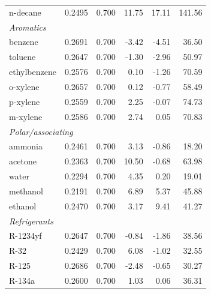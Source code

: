\begin{table}[H]
\begin{tabular}{lrrrrr}
\quad n-decane & 0.2495 & 0.700 & 11.75 & 17.11 & 141.56 \\
\multicolumn{6}{l}{\itshape Aromatics}\\
\quad benzene & 0.2691 & 0.700 & -3.42 & -4.51 & 36.50 \\
\quad toluene & 0.2647 & 0.700 & -1.30 & -2.96 & 50.97 \\
\quad ethylbenzene & 0.2576 & 0.700 & 0.10 & -1.26 & 70.59 \\
\quad o-xylene & 0.2657 & 0.700 & 0.12 & -0.77 & 58.49 \\
\quad p-xylene & 0.2559 & 0.700 & 2.25 & -0.07 & 74.73 \\
\quad m-xylene & 0.2586 & 0.700 & 2.74 & 0.05 & 70.83 \\
\multicolumn{6}{l}{\itshape Polar/associating}\\
\quad ammonia & 0.2461 & 0.700 & 3.13 & -0.86 & 18.20 \\
\quad acetone & 0.2363 & 0.700 & 10.50 & -0.68 & 63.98 \\
\quad water & 0.2294 & 0.700 & 4.35 & 0.20 & 19.01 \\
\quad methanol & 0.2191 & 0.700 & 6.89 & 5.37 & 45.88 \\
\quad ethanol & 0.2470 & 0.700 & 3.17 & 9.41 & 41.27 \\
\multicolumn{6}{l}{\itshape Refrigerants}\\
\quad R-1234yf & 0.2647 & 0.700 & -0.84 & -1.86 & 38.56 \\
\quad R-32 & 0.2429 & 0.700 & 6.08 & -1.02 & 32.55 \\
\quad R-125 & 0.2686 & 0.700 & -2.48 & -0.65 & 30.27 \\
\quad R-134a & 0.2600 & 0.700 & 1.03 & 0.06 & 36.31 \\
\bottomrule
\end{tabular}
\end{table}

